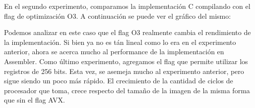 \documentclass[a4paper]{article}
\begin{document}
En el segundo experimento, comparamos la implementación C compilando con el flag de optimización O3. A continuación se puede ver el gráfico del mismo:

\begin{centering}
\end{centering}


Podemos analizar en este caso que el flag O3 realmente cambia el rendimiento de la implementación. Si bien ya no es tán lineal como lo era en el
experimento anterior, ahora se acerca mucho al performance de la implementación en Assembler.
\newline
Como último experimento, agregamos el flag que permite utilizar los registros de 256 bits. Esta vez, se asemeja mucho al experimento anterior, pero
sigue siendo un poco más rápido. El crecimiento de la cantidad de ciclos de procesador que toma, crece respecto del tamaño de la imagen de la misma
forma que sin el flag AVX.
\end{document}
